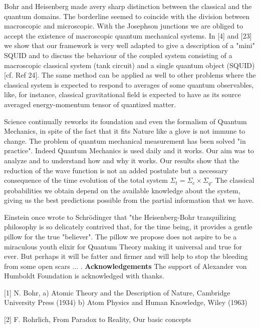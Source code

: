 \par
Bohr and Heisenberg made avery sharp distinction between the
classical and the quantum domains. The borderline seemed to
coincide with the division between macroscopic and microscopic.
With the Josephson junctions we are obliged to accept the
existence of macroscopic quantum mechanical systems. In [4] and [23]
we show that our framework is very well adapted to give a
description of a "mini" SQUID and to discuss the behaviour of the
coupled system consisting of a macroscopic classical system
(tank circuit) and a single quantum object (SQUID) [cf. Ref 24].
The same method
can be applied as well to other problems where the classical
system is expected to respond to averages of some quantum
observables, like, for instance, classical gravitational field is
expected to have as its source averaged energy-momentum tensor of
quantized matter.
\par
Science continually reworks its foundation and even the formalism of
Quantum Mechanics, in spite of the fact that it fits Nature like
a glove is not immune to change.
The problem of quantum mechanical measurement has been solved
"in practice". Indeed Quantum Mechanics is used daily and it works.
Our aim was to analyze and to understand how and why it works. Our
results show that the reduction of the wave function is not an
added postulate but a necessary consequence of the time evolution
of the total system $\Sigma_t = \Sigma_c \times \Sigma_q$. The
classical probabilities we obtain depend on the available
knowledge about the system, giving us the best predictions possible
from the partial information that we have.
\par
Einstein once wrote to Schr\"odinger that "the Heisenberg-Bohr
tranquilizing philosophy is so delicately contrived that, for the time
being, it provides a gentle pillow for the true "believer". The
pillow we propose does not aspire to be a miraculous youth
elixir for Quantum Theory making it universal and true for ever.
But perhaps
it will be fatter and firmer and will help to stop the bleeding
from some open scars ... .
\medskip\noindent
{\bf Acknowledgements}
\medskip\noindent
The support of Alexander von Humboldt Foundation is acknowledged with
thanks.
\vfill\eject
{}\medskip
\item{[1]} N. Bohr, a) Atomic Theory and the Description of Nature,
Cambridge University Press (1934)\hfill\break
b) Atom Physics and Human Knowledge, Wiley (1963)
\item{[2]} F. Rohrlich, From Paradox to Reality, Our basic concepts

